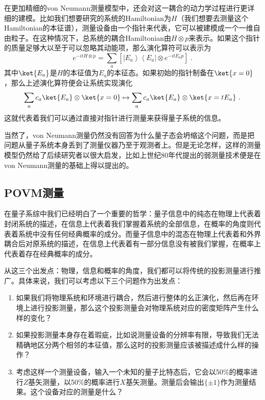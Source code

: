 在更加精细的von Neumann测量模型中，还会对这一耦合的动力学过程进行更详细的建模。比如我们想要研究的系统的Hamiltonian为$H$（我们想要去测量这个Hamiltonian的本征谱），测量设备由一个指针来代表，它可以被建模成一个一维自由粒子。在这种情况下，总系统的耦合Hamiltonian由$H\otimes p$来表示。如果这个指针的质量足够大以至于可以忽略其动能项，那么演化算符可以表示为\begin{equation}
e^{-i t H \otimes p}=\sum_a\left[\left|E_a\right\rangle\left\langle E_a\right| \otimes e^{-i t E_a p}\right]~.
\end{equation}
其中$\ket{E_a}$是$H$的本征值为$E_a$的本征态。如果初始的指针制备在$\ket{x=0}$，那么上述演化算符便会让系统实现演化
\begin{equation}
\sum_a c_a\ket{E_a}\otimes\ket{x=0}\mapsto \sum_a c_a \ket{E_a}\otimes \ket{x=tE_a}~.
\end{equation}
这就代表着我们可以通过直接对指针进行测量来获得量子系统的信息。

当然了，von Neumann测量仍然没有回答为什么量子态会坍缩这个问题，而是把问题从量子系统本身丢到了测量仪器乃至于观测者上。但是无论怎样，这样的测量模型仍然给了后续研究者以很大启发，比如上世纪80年代提出的弱测量技术便是在von Neumann测量的基础上得以提出的。

\subsection{POVM测量}

在量子系综中我们已经明白了一个重要的哲学：量子信息中的纯态在物理上代表着封闭系统的描述，在信息上代表着我们掌握着系统的全部信息，在概率的角度则代表着系统中没有任何经典概率的成分。而量子信息中的混态在物理上代表着和外界耦合后对原系统的描述，在信息上代表着有一部分信息没有被我们掌握，在概率上代表着存在经典概率的成分。

从这三个出发点：物理，信息和概率的角度，我们都可以将传统的投影测量进行推广。具体来说，我们可以考虑以下三个问题作为出发点：
\begin{enumerate}
\item 如果我们将物理系统和环境进行耦合，然后进行整体的幺正演化，然后再在环境上进行投影测量，那么这个投影测量会对物理系统对应的密度矩阵产生什么样的变化？
\item 如果投影测量本身存在着瑕疵，比如说测量设备的分辨率有限，导致我们无法精确地区分两个相邻的本征值，那么这时的投影测量应该被描述成什么样的操作？
\item 考虑这样一个测量设备，输入一个未知的量子比特态后，它会以50\%的概率进行$Z$基矢测量，以50\%的概率进行$X$基矢测量。测量后会输出$\{\pm1\}$作为测量结果。这个设备对应的测量是什么？
\end{enumerate}

